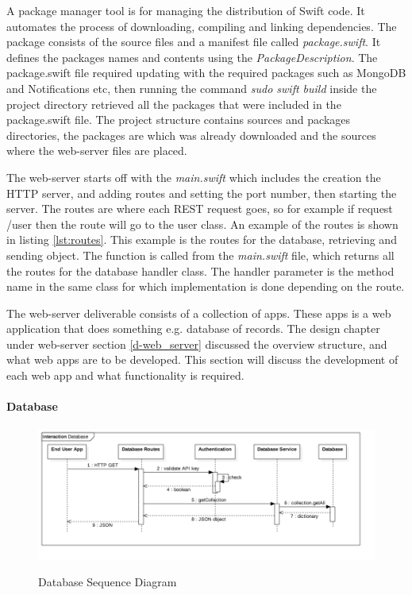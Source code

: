 A package manager tool is for managing the distribution of Swift code. It automates the process of downloading, compiling and linking dependencies. The package consists of the source files and a manifest file called \textit{package.swift}. It defines the packages names and contents using the \textit{PackageDescription}. \cite{swift_manager} The package.swift file required updating with the required packages such as MongoDB and Notifications etc, then running the command \textit{sudo swift build} inside the project directory retrieved all the packages that were included in the package.swift file. The project structure contains sources and packages directories, the packages are which was already downloaded and the sources where the web-server files are placed. 

The web-server starts off with the \textit{main.swift} which includes the creation the HTTP server, and adding routes and setting the port number, then starting the server. The routes are where each REST request goes, so for example if request /user then the route will go to the user class. An example of the routes is shown in listing \ref{lst:routes}. This example is the routes for the database, retrieving and sending object. The function is called from the \textit{main.swift} file, which returns all the routes for the database handler class. The handler parameter is the method name in the same class for which implementation is done depending on the route.



The web-server deliverable consists of a collection of apps. These apps is a web application that does something e.g. database of records. The design chapter under web-server section \ref{d-web_server} discussed the overview structure, and what web apps are to be developed. This section will discuss the development of each web app and what functionality is required.

\paragraph{Database}

\begin{figure}[!h]
    \caption{Database Sequence Diagram}
    \centering
    \includegraphics[width=150mm]{images/sequence/Database}
    \label{fig:database-seq}
\end{figure} 

